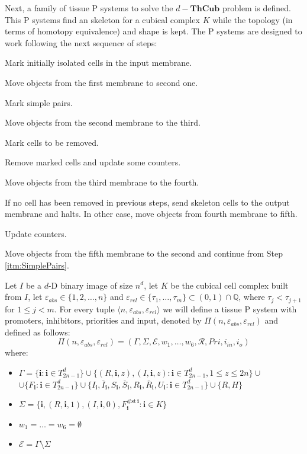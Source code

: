 \documentclass[journal]{IEEEtran}
\begin{document}
Next, a family of tissue P systems to solve the 
$d-\mathbf{ThCub}$ problem is defined. This P systems find an skeleton for a cubical complex $K$
while the topology (in terms of homotopy equivalence) and shape is kept. The P systems
are designed to work following the next sequence of steps:
\begin{list}{Step :}{}
\item Mark initially isolated cells in the input membrane.
\item Move objects from the first membrane to second one.
\item Mark simple pairs. \label{itm:SimplePairs}
\item Move objects from the second membrane to the third.
\item Mark cells to be removed.
\item Remove marked cells and update some counters.
\item Move objects from the third membrane to the fourth.
\item If no cell has been removed in previous steps, send skeleton cells to the output 
membrane and halts. In other case, move objects from fourth membrane to fifth.
\item Update counters.
\item Move objects from the fifth membrane to the second and continue from Step \ref{itm:SimplePairs}.
\end{list}
Let $I$ be a $d$-D binary image of size $n^d$, let $K$ be the cubical cell complex built
from $I$, let $\varepsilon_{abs} \in \{1, 2, \ldots, n\}$ and $\varepsilon_{rel}
\in \{\tau_1, \ldots, \tau_m\} \subset (0,1) \cap \mathbb{Q}$, where $\tau_j <
\tau_{j+1}$ for $1 \leq j < m$. For every tuple $\langle n, \varepsilon_{abs},
\varepsilon_{rel} \rangle$ we will define a tissue P system with promoters,
inhibitors, priorities and input, denoted by $\Pi(n, \varepsilon_{abs},
\varepsilon_{rel})$ and defined as follows:
$$
 \Pi(n, \varepsilon_{abs}, \varepsilon_{rel}) =
 (\Gamma,\Sigma,\mathcal{E},w_1,\dots,w_6,\mathcal{R},Pri,i_{in},i_o)
$$
where:
\begin{itemize}
    \item $\Gamma = \{\mathbf{i}: \mathbf{i} \in T_{2n-1}^d\} \cup \{(R,
    \mathbf{i}, z), (I, \mathbf{i}, z): \mathbf{i} \in T_{2n-1}^d, 1 \leq z \leq
    2n\}\cup$ \newline $\cup\{F_\mathbf{i}:\mathbf{i} \in
    T_{2n-1}^d\}\cup\{I_\mathbf{i}, \overline{I}_\mathbf{i}, S_\mathbf{i},
    \overline{S}_\mathbf{i}, R_\mathbf{i}, \overline{R}_\mathbf{i}, U_\mathbf{i}:
    \mathbf{i} \in T_{2n-1}^d\} \cup \{R, H\}$
    \item $\Sigma =
    \{\mathbf{i},(R,\mathbf{i},1),(I,\mathbf{i},0),F_\mathbf{i}^{\#\mathrm{st}\,\mathbf{i}}:
    \mathbf{i} \in K\}$
    \item $w_1 = \ldots = w_6 = \emptyset$
    \item $\mathcal{E} = \Gamma \setminus \Sigma$
\end{itemize}
\end{document}
